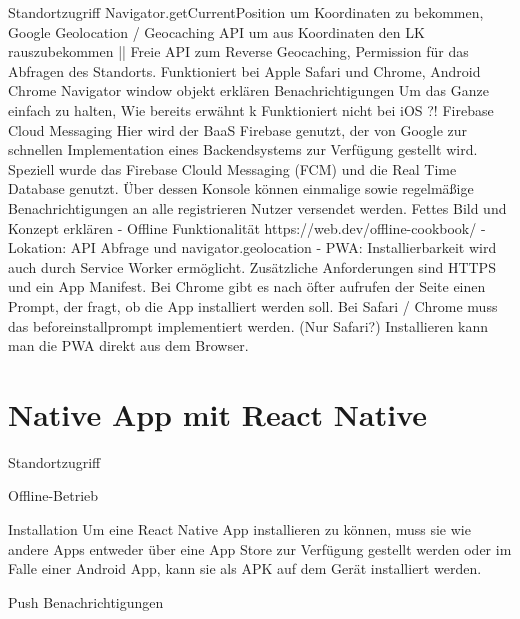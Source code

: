 Standortzugriff
Navigator.getCurrentPosition um Koordinaten zu bekommen, Google Geolocation / Geocaching API um aus Koordinaten den LK rauszubekommen || Freie API zum Reverse Geocaching, Permission für das Abfragen des Standorts. Funktioniert bei Apple Safari und Chrome, Android Chrome
Navigator window objekt erklären
Benachrichtigungen
Um das Ganze einfach zu halten, 
Wie bereits erwähnt k
Funktioniert nicht bei iOS ?!
Firebase Cloud Messaging\cite{Hyun.2018}
Hier wird der BaaS Firebase genutzt, der von Google zur schnellen Implementation eines Backendsystems zur Verfügung gestellt wird. Speziell wurde das Firebase Clould Messaging (FCM) und die Real Time Database genutzt. Über dessen Konsole können einmalige sowie regelmäßige Benachrichtigungen an alle registrieren Nutzer versendet werden. Fettes Bild und Konzept erklären
-	Offline Funktionalität https://web.dev/offline-cookbook/
-	Lokation: API Abfrage und navigator.geolocation
-	PWA: Installierbarkeit wird auch durch Service Worker ermöglicht. Zusätzliche Anforderungen sind HTTPS und ein App Manifest. Bei Chrome gibt es nach öfter aufrufen der Seite einen Prompt, der fragt, ob die App installiert werden soll. Bei Safari / Chrome muss das beforeinstallprompt implementiert werden. (Nur Safari?)
Installieren kann man die PWA direkt aus dem Browser.


\section{Native App mit React Native}
Standortzugriff

Offline-Betrieb

Installation
Um eine React Native App installieren zu können, muss sie wie andere Apps entweder über eine App Store zur Verfügung gestellt werden oder im Falle einer Android App, kann sie als APK auf dem Gerät installiert werden.

Push Benachrichtigungen